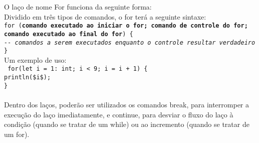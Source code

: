 \documentclass[12pt,a4paper]{article}
\def\emph#1{\textbf{#1}} %
\begin{document}
O laço de nome For funciona da seguinte forma: \\

Dividido em três tipos de comandos, o for terá a seguinte sintaxe: \\

\noindent\texttt{for (\emph{comando executado ao iniciar o for; comando de controle do for; comando executado ao final do for}) \{\\
\indent\textit{-{}- comandos a serem executados enquanto o controle resultar verdadeiro} \\
\}}\\

Um exemplo de uso: \\[0.2cm]
\texttt{
\noindent for(let i = 1: int; i < 9; i = i + 1) \{\\
\indent println(\$i\$);\\
\noindent \}\\
}\\

Dentro dos laços, poderão ser utilizados os comandos break, para interromper a execução do laço imediatamente, e continue, para desviar o fluxo do laço à condição (quando se tratar de um while) ou ao incremento (quando se tratar de um for).
\end{document}
